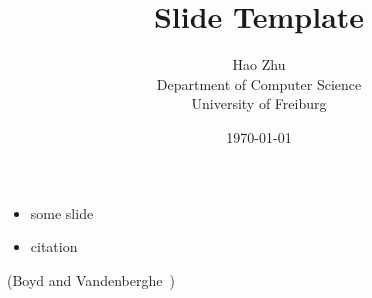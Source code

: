 \documentclass[landscape]{foils}
\title{Slide Template}
\author{
    Hao Zhu\\[10pt]
    Department of Computer Science\\
    University of Freiburg
}
\date{\today}
\begin{document}
\maketitle

\vf
\begin{itemize}\itemsep=20pt
    \item some slide
    \item citation
\end{itemize}
\vf

\lipsum[1]

(Boyd and Vandenberghe~\cite{boyd2004convex})

\end{document}
